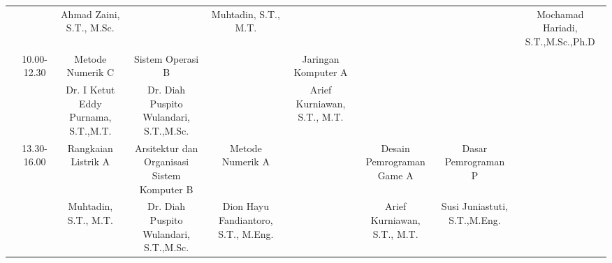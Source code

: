 \begin{table}[]
\begin{tabular}{|c|c|ccccccc|}
                          &                              & \multicolumn{1}{c|}{Ahmad Zaini, S.T., M.Sc.}                     & \multicolumn{1}{c|}{}                                              & \multicolumn{1}{c|}{Muhtadin, S.T., M.T.}                     & \multicolumn{1}{c|}{}                                                & \multicolumn{1}{c|}{}                                             & \multicolumn{1}{c|}{}                                              & Mochamad Hariadi,   S.T.,M.Sc.,Ph.D             \\ \cline{2-9} 
                          & \multirow{2}{*}{10.00-12.30} & \multicolumn{1}{c|}{Metode Numerik C}                             & \multicolumn{1}{c|}{Sistem Operasi B}                              & \multicolumn{1}{c|}{}                                         & \multicolumn{1}{c|}{Jaringan Komputer A}                             & \multicolumn{1}{c|}{}                                             & \multicolumn{1}{c|}{}                                              &                                                 \\ \cline{3-9} 
                          &                              & \multicolumn{1}{c|}{Dr. I Ketut Eddy Purnama, S.T.,M.T.}          & \multicolumn{1}{c|}{Dr. Diah Puspito   Wulandari, S.T.,M.Sc.}      & \multicolumn{1}{c|}{}                                         & \multicolumn{1}{c|}{Arief Kurniawan,   S.T., M.T.}                   & \multicolumn{1}{c|}{}                                             & \multicolumn{1}{c|}{}                                              &                                                 \\ \cline{2-9} 
                          & \multirow{2}{*}{13.30-16.00} & \multicolumn{1}{c|}{Rangkaian Listrik A}                          & \multicolumn{1}{c|}{Arsitektur dan   Organisasi Sistem Komputer B} & \multicolumn{1}{c|}{Metode Numerik A}                         & \multicolumn{1}{c|}{}                                                & \multicolumn{1}{c|}{Desain Pemrograman   Game A}                  & \multicolumn{1}{c|}{Dasar Pemrograman P}                           &                                                 \\ \cline{3-9} 
                          &                              & \multicolumn{1}{c|}{Muhtadin, S.T., M.T.}                         & \multicolumn{1}{c|}{Dr. Diah Puspito   Wulandari, S.T.,M.Sc.}      & \multicolumn{1}{c|}{Dion Hayu   Fandiantoro, S.T., M.Eng.}    & \multicolumn{1}{c|}{}                                                & \multicolumn{1}{c|}{Arief Kurniawan,   S.T., M.T.}                & \multicolumn{1}{c|}{Susi Juniastuti,   S.T.,M.Eng.}                &                                                 \\ \hline

\end{tabular}
\end{table}
